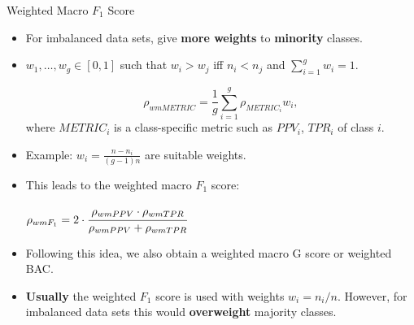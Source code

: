 \documentclass[11pt,compress,t,notes=noshow, xcolor=table]{beamer}
\begin{document}
\begin{vbframe}{Weighted Macro $F_1$ Score}

	\footnotesize{

	\begin{itemize}

		\item For imbalanced data sets, give \textbf{more weights} to \textbf{minority} classes.
        \vspace{10pt}
  
        \item $w_1,\ldots,w_g \in[0,1]$  such that $w_i > w_j$ iff $n_i < n_j$ and $\sum_{i=1}^g w_i = 1.$

        $$\rho_{wmMETRIC} = \frac{1}{g}\sum_{i=1}^g \rho_{METRIC_i} w_i,$$
        where $METRIC_i$ is a class-specific metric such as $PPV_i$, $TPR_i$ of class $i$.
        \vspace{10pt}

	 
		\item Example: $w_i = \frac{n - n_i}{(g-1)n}$ are suitable weights.
        \vspace{10pt}

		\item This leads to the weighted macro $F_1$ score:
			
		$\rho_{wmF_1} = 2 \cdot \cfrac{\rho_{wmPPV} \cdot \rho_{wmTPR}}{\rho_{wmPPV} + 
			\rho_{wmTPR}}$
		\vspace{10pt}
  
		\item Following this idea, we also obtain a weighted macro G score or weighted BAC.
        \vspace{10pt}
	
		\item \textbf{Usually} the weighted $F_1$ score is used with weights $w_i = n_i/n$. However, for imbalanced data sets this would \textbf{overweight} majority classes.

	\end{itemize}
	}
\end{vbframe}
\end{document}
